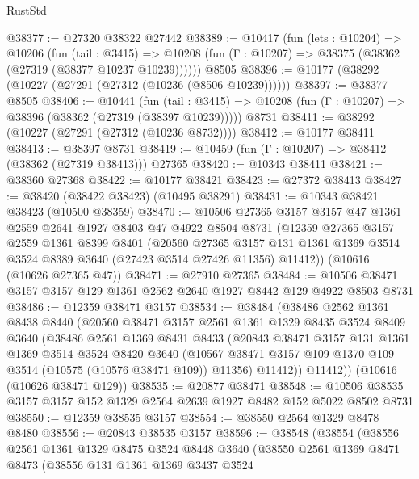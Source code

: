 \begin{lexlean}{RustStd}
\begin{coremodule}
@38377 := @27320 @38322 @27442
@38389 := @10417
    (fun (lets : @10204) =>
    @10206
      (fun (tail : @3415) =>
      @10208 (fun (Γ : @10207) => @38375 (@38362 (@27319 (@38377 @10237 @10239))))))
    @8505
@38396 := @10177 (@38292 (@10227 (@27291 (@27312 (@10236 (@8506 @10239))))))
@38397 := @38377 @8505
@38406 := @10441
    (fun (tail : @3415) => @10208 (fun (Γ : @10207) => @38396 (@38362 (@27319 (@38397 @10239)))))
    @8731
@38411 := @38292 (@10227 (@27291 (@27312 (@10236 @8732))))
@38412 := @10177 @38411
@38413 := @38397 @8731
@38419 := @10459 (fun (Γ : @10207) => @38412 (@38362 (@27319 @38413))) @27365
@38420 := @10343 @38411
@38421 := @38360 @27368
@38422 := @10177 @38421
@38423 := @27372 @38413
@38427 := @38420 (@38422 @38423) (@10495 @38291)
@38431 := @10343 @38421 @38423 (@10500 @38359)
@38470 := @10506
    @27365
    @3157
    @3157
    @47
    @1361
    @2559
    @2641
    @1927
    @8403
    @47
    @4922
    @8504
    @8731
    (@12359
      @27365
      @3157
      @2559
      @1361
      @8399
      @8401
      (@20560
        @27365
        @3157
        @131
        @1361
        @1369
        @3514
        @3524
        @8389
        @3640
        (@27423 @3514 @27426 @11356)
        @11412))
    (@10616 (@10626 @27365 @47))
@38471 := @27910 @27365
@38484 := @10506 @38471 @3157 @3157 @129 @1361 @2562 @2640 @1927 @8442 @129 @4922 @8503 @8731
@38486 := @12359 @38471 @3157
@38534 := @38484
    (@38486
      @2562
      @1361
      @8438
      @8440
      (@20560
        @38471
        @3157
        @2561
        @1361
        @1329
        @8435
        @3524
        @8409
        @3640
        (@38486
          @2561
          @1369
          @8431
          @8433
          (@20843
            @38471
            @3157
            @131
            @1361
            @1369
            @3514
            @3524
            @8420
            @3640
            (@10567 @38471 @3157 @109 @1370 @109 @3514 (@10575 (@10576 @38471 @109)) @11356)
            @11412))
        @11412))
    (@10616 (@10626 @38471 @129))
@38535 := @20877 @38471
@38548 := @10506 @38535 @3157 @3157 @152 @1329 @2564 @2639 @1927 @8482 @152 @5022 @8502 @8731
@38550 := @12359 @38535 @3157
@38554 := @38550 @2564 @1329 @8478 @8480
@38556 := @20843 @38535 @3157
@38596 := @38548
    (@38554
      (@38556
        @2561
        @1361
        @1329
        @8475
        @3524
        @8448
        @3640
        (@38550
          @2561
          @1369
          @8471
          @8473
          (@38556
            @131
            @1361
            @1369
            @3437
            @3524

\end{coremodule}
\end{lexlean}
